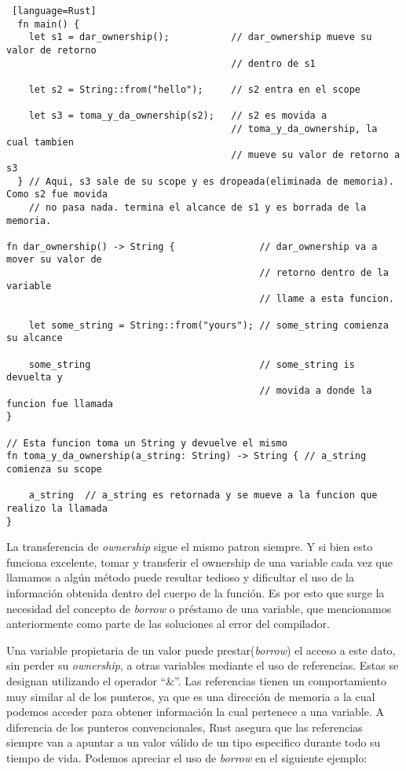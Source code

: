\begin{lstlisting} [language=Rust]
  fn main() {
    let s1 = dar_ownership();           // dar_ownership mueve su valor de retorno
                                        // dentro de s1

    let s2 = String::from("hello");     // s2 entra en el scope

    let s3 = toma_y_da_ownership(s2);   // s2 es movida a
                                        // toma_y_da_ownership, la cual tambien
                                        // mueve su valor de retorno a s3
  } // Aqui, s3 sale de su scope y es dropeada(eliminada de memoria). Como s2 fue movida
    // no pasa nada. termina el alcance de s1 y es borrada de la memoria.

fn dar_ownership() -> String {               // dar_ownership va a mover su valor de
                                             // retorno dentro de la variable
                                             // llame a esta funcion.

    let some_string = String::from("yours"); // some_string comienza su alcance

    some_string                              // some_string is devuelta y
                                             // movida a donde la funcion fue llamada
}

// Esta funcion toma un String y devuelve el mismo
fn toma_y_da_ownership(a_string: String) -> String { // a_string comienza su scope

    a_string  // a_string es retornada y se mueve a la funcion que realizo la llamada
}
\end{lstlisting}

La transferencia de \textit{ownership} sigue el mismo patron siempre. Y si bien esto funciona excelente, tomar y transferir el ownership de una variable cada vez que llamamos a algún método puede resultar tedioso y dificultar el uso de la información obtenida dentro del cuerpo de la función. Es por esto que surge la necesidad del concepto de \textit{borrow} o préstamo de una variable, que mencionamos anteriormente como parte de las soluciones al error del compilador.

Una variable propietaria de un valor puede prestar(\textit{borrow}) el acceso a este dato, sin perder su \textit{ownership}, a otras variables mediante el uso de referencias. Estas se designan utilizando el operador ``\&''. Las referencias tienen un comportamiento muy similar al de los punteros, ya que es una dirección de memoria a la cual podemos acceder para obtener información la cual pertenece a una variable. A diferencia de los punteros convencionales, Rust asegura que las referencias siempre van a apuntar a un valor válido de un tipo especifico durante todo su tiempo de vida. Podemos apreciar el uso de \textit{borrow} en el siguiente ejemplo:

